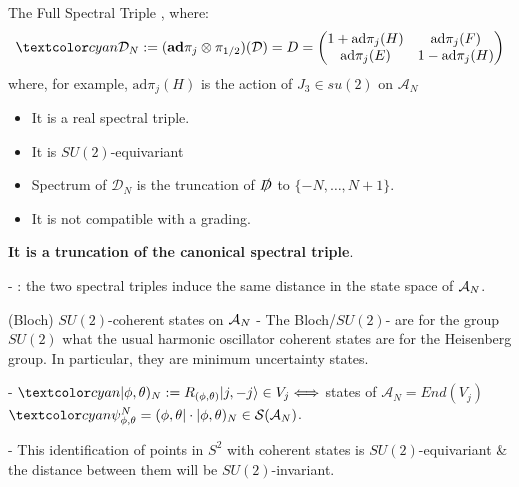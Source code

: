 \begin{frame}{The Full Spectral Triple} %
, where:
\begin{multline}
    \lbtext{\mathcal D_N} := (\textbf{ad}\pi_j \otimes \pi_{1/2})(\mathcal D) = D = \begin{pmatrix} 1 + \text{ad}\pi_j(H) & \text{ad}\pi_j(F) \\ \text{ad}\pi_j(E) & 1 - \text{ad}\pi_j(H)\end{pmatrix} 
\end{multline}
where, for example, $\text{ad}\pi_j(H)$ is the action of $J_3 \in su(2)$ on $\mathcal A_N$

    \begin{itemize}
    
    \item It is a real spectral triple.
    
    \item It is $SU(2)$-equivariant
    
    \item Spectrum of $\mathcal D_N$ is the truncation of $\slashed D$ to $\{-N, \dots, N+1\}$.%
    
    \item It is not compatible with a grading.
    
    \end{itemize}

\textbf{It is a truncation of the canonical spectral triple}.

- : the two spectral triples induce the same distance in the state space of $\mathcal A_N$.
\end{frame}

\begin{frame}{(Bloch) $SU(2)$-coherent states on $\mathcal A_N$} %
- The Bloch/$SU(2)$- are for the group $SU(2)$ what the usual harmonic oscillator coherent states are for the Heisenberg group. In particular, they are minimum uncertainty states. 


-  $\lbtext{|\phi, \theta)_N} := R_{(\phi, \theta)}|j, -j\rangle \in V_j \Longleftrightarrow $ states of $\mathcal A_N = End(V_j)$ $\lbtext{\psi^N_{\phi, \theta}} = (\phi, \theta| \cdot |\phi, \theta)_N \in \mathcal S(\mathcal A_N)$. 

- This identification of points in $S^2$ with coherent states is $SU(2)$-equivariant \& the distance between them will be $SU(2)$-invariant.

\end{frame}

